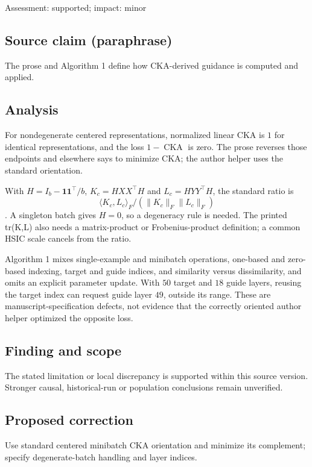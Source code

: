 \documentclass[11pt]{article}
\begin{document}
Assessment: supported; impact: minor

\subsection*{Source claim (paraphrase)}

The prose and Algorithm 1 define how CKA-derived guidance is computed and applied.

\subsection*{Analysis}

For nondegenerate centered representations, normalized linear CKA is \(1\) for identical representations, and the loss \(1-\operatorname{CKA}\) is zero. The prose reverses those endpoints and elsewhere says to minimize CKA; the author helper uses the standard orientation.

With \(H=I_b-\mathbf1\mathbf1^\top/b\), \(K_c=HXX^\top H\) and \(L_c=HYY^\top H\), the standard ratio is \[\langle K_c,L_c\rangle_F/(\|K_c\|_F\|L_c\|_F)\]. A singleton batch gives \(H=0\), so a degeneracy rule is needed. The printed tr(K,L) also needs a matrix-product or Frobenius-product definition; a common HSIC scale cancels from the ratio.

Algorithm 1 mixes single-example and minibatch operations, one-based and zero-based indexing, target and guide indices, and similarity versus dissimilarity, and omits an explicit parameter update. With \(50\) target and \(18\) guide layers, reusing the target index can request guide layer \(49\), outside its range. These are manuscript-specification defects, not evidence that the correctly oriented author helper optimized the opposite loss.

\subsection*{Finding and scope}

The stated limitation or local discrepancy is supported within this source version. Stronger causal, historical-run or population conclusions remain unverified.

\subsection*{Proposed correction}

Use standard centered minibatch CKA orientation and minimize its complement; specify degenerate-batch handling and layer indices.
\end{document}
